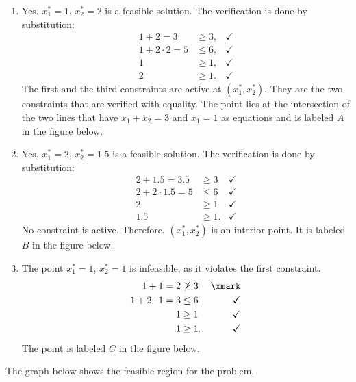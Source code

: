 
\begin{enumerate}
    \item Yes, $x_1^* = 1$, $x_2^* = 2$ is a feasible solution. The verification is done by substitution:
    \begin{align*}
     1 + 2 = 3& \geq 3,  &\checkmark  \\
     1 + 2 \cdot 2 = 5 & \leq 6,  &\checkmark  \\
     1 & \geq 1,  &\checkmark \\
     2 & \geq 1.  &\checkmark 
    \end{align*}
%
    The first and the third constraints are active at $(x_1^*,
    x_2^*)$. They are the two constraints that are verified with
    equality. The point lies at the intersection of the two lines that
    have $x_1 + x_2 = 3$ and $x_1 = 1$ as equations and is labeled
     $A$ in the figure below.
%
    \item Yes, $x_1^* = 2$, $x_2^* = 1.5$ is a feasible solution. The verification is done by substitution:
    \begin{align*}
     2 + 1.5 = 3.5 & \geq 3  &\checkmark \\
     2 + 2 \cdot 1.5 = 5 & \leq 6 & \checkmark  \\
     2 & \geq 1 & \checkmark  \\
     1.5 & \geq 1. & \checkmark  
    \end{align*}
%
    No constraint is active. Therefore, $(x_1^*, x_2^*)$ is an
    interior point. It is labeled $B$ in the figure below.

%
    \item The point $x_1^* = 1$, $x_2^* = 1$ is infeasible, as it
      violates the first constraint. 
    \begin{align*}
     1 + 1 = 2 & \not\geq 3 & \xmark   \\
     1 + 2 \cdot 1 = 3 & \leq 6 & \checkmark  \\
     1 & \geq 1 & \checkmark  \\
     1 & \geq 1. & \checkmark 
    \end{align*}
%    
    The point is labeled $C$ in the figure below.
\end{enumerate}

The graph below shows the feasible region for the problem.
     
